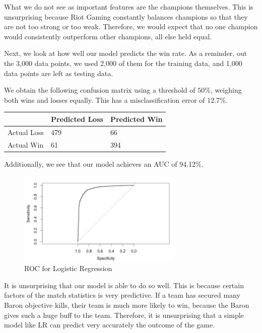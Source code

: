 \documentclass[runningheads]{llncs}
\begin{document}
	What we do not see as important features are the champions themselves. This is unsurprising because Riot Gaming constantly balances champions so that they are not too strong or too weak. Therefore, we would expect that no one champion would consistently outperform other champions, all else held equal.

	Next, we look at how well our model predicts the win rate. As a reminder, out the 3,000 data points, we used 2,000 of them for the training data, and 1,000 data points are left as testing data.

	We obtain the following confusion matrix using a threshold of $50\%$, weighing both wins and losses equally. This has a misclassification error of $12.7\%$.


	\begin{center}
		\begin{tabular}{ | L{3cm} | C{2cm} | C{2cm} | }
			\hline
			& Predicted Loss & Predicted Win \\ \hline
			Actual Loss & 479 & 66 \\ \hline
			Actual Win & 61 & 394 \\ \hline
		\end{tabular}
	\end{center}
	
	Additionally, we see that our model achieves an AUC of 94.12\%.
	
	\begin{figure}[!htb]
		\centering
		\includegraphics[width=0.7\textwidth]{images/lr_roc.png}
		\caption{ROC for Logistic Regression}
	\end{figure}
	
	It is unsurprising that our model is able to do so well. This is because certain factors of the match statistics is very predictive. If a team has secured many Baron objective kills, their team is much more likely to win, because the Baron gives such a huge buff to the team. Therefore, it is unsurprising that a simple model like LR can predict very accurately the outcome of the game. 
\end{document}
